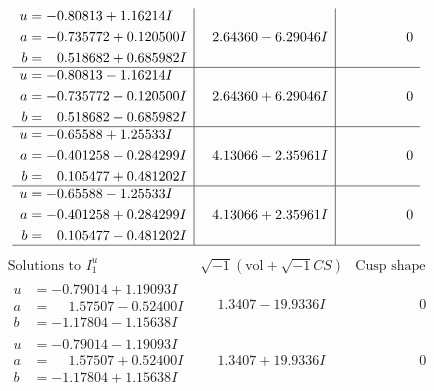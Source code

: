 \documentclass[1p]{elsarticle_modified}
\theoremstyle{definition}
\newcommand{\I}{\sqrt{-1}}
\begin{document}
$$\begin{array}{c|c|c}
\begin{aligned}
u &= -0.80813 + 1.16214 I \\
a &= -0.735772 + 0.120500 I \\
b &= \phantom{-}0.518682 + 0.685982 I\end{aligned}
 & \phantom{-}2.64360 - 6.29046 I & \phantom{-0.000000 } 0 \\ \hline\begin{aligned}
u &= -0.80813 - 1.16214 I \\
a &= -0.735772 - 0.120500 I \\
b &= \phantom{-}0.518682 - 0.685982 I\end{aligned}
 & \phantom{-}2.64360 + 6.29046 I & \phantom{-0.000000 } 0 \\ \hline\begin{aligned}
u &= -0.65588 + 1.25533 I \\
a &= -0.401258 - 0.284299 I \\
b &= \phantom{-}0.105477 + 0.481202 I\end{aligned}
 & \phantom{-}4.13066 - 2.35961 I & \phantom{-0.000000 } 0 \\ \hline\begin{aligned}
u &= -0.65588 - 1.25533 I \\
a &= -0.401258 + 0.284299 I \\
b &= \phantom{-}0.105477 - 0.481202 I\end{aligned}
 & \phantom{-}4.13066 + 2.35961 I & \phantom{-0.000000 } 0\\
 \hline 
 \end{array}$$\newpage$$\begin{array}{c|c|c}  
\text{Solutions to }I^u_{1}& \I (\text{vol} + \sqrt{-1}CS) & \text{Cusp shape}\\
 \hline 
\begin{aligned}
u &= -0.79014 + 1.19093 I \\
a &= \phantom{-}1.57507 - 0.52400 I \\
b &= -1.17804 - 1.15638 I\end{aligned}
 & \phantom{-}1.3407 - 19.9336 I & \phantom{-0.000000 } 0 \\ \hline\begin{aligned}
u &= -0.79014 - 1.19093 I \\
a &= \phantom{-}1.57507 + 0.52400 I \\
b &= -1.17804 + 1.15638 I\end{aligned}
 & \phantom{-}1.3407 + 19.9336 I & \phantom{-0.000000 } 0 \\ \hline\begin{aligned}

\end{aligned}
\end{array}$$
\end{document}
